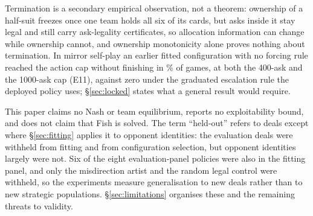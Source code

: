 Termination is a secondary empirical observation, not a theorem: ownership of a
half-suit freezes once one team holds all six of its cards, but asks inside it
stay legal and still carry ask-legality certificates, so allocation information
can change while ownership cannot, and ownership monotonicity alone proves
nothing about termination. In mirror self-play an earlier fitted configuration
with no forcing rule reached the action cap without finishing in
\numMirrorCycle\% of games, at both the 400-ask and the 1000-ask cap (E11),
against zero under the graduated escalation rule the deployed policy uses;
\S\ref{sec:locked} states what a general result would require.

This paper claims no Nash or team equilibrium, reports no exploitability bound,
and does not claim that Fish is solved. The term ``held-out'' refers to deals
except where \S\ref{sec:fitting} applies it to opponent identities: the
evaluation deals were withheld from fitting and from configuration selection, but
opponent identities largely were not. Six of the eight evaluation-panel policies
were also in the fitting panel, and only the misdirection artist and the random
legal control were withheld, so the experiments measure generalisation to new
deals rather than to new strategic populations. \S\ref{sec:limitations} organises
these and the remaining threats to validity.
